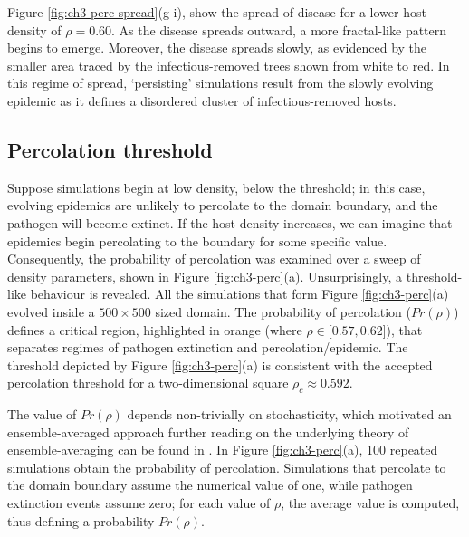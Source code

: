 Figure \ref{fig:ch3-perc-spread}(g-i), show the spread of disease for a lower host density of $\rho = 0.60$.
As the disease spreads outward, a more fractal-like pattern begins to emerge.
Moreover, the disease spreads slowly, as evidenced by the smaller area traced by the infectious-removed trees shown from white to red.
In this regime of spread, `persisting' simulations result from the slowly evolving epidemic as it defines a disordered cluster of infectious-removed hosts.
\newpage

\subsection{Percolation threshold}
\label{section:universality}

Suppose simulations begin at low density, below the threshold; in this case, evolving epidemics are unlikely to percolate to the domain boundary, and the pathogen will become extinct.
If the host density increases, we can imagine that epidemics begin percolating to the boundary for some specific value.
Consequently, the probability of percolation was examined over a sweep of density parameters, shown in Figure \ref{fig:ch3-perc}(a).
Unsurprisingly, a threshold-like behaviour is revealed.
All the simulations that form Figure \ref{fig:ch3-perc}(a) evolved inside a $500\times 500$ sized domain.
The probability of percolation ($Pr(\rho)$) defines
a critical region, highlighted in orange (where $ \rho \in [0.57, 0.62$]), that separates regimes of pathogen extinction and percolation/epidemic.
The threshold depicted by Figure \ref{fig:ch3-perc}(a) is consistent with the accepted percolation threshold for a two-dimensional square $\rho_c \approx 0.592$.

The value of $Pr(\rho)$ depends non-trivially on stochasticity, which motivated an ensemble-averaged approach\textemdash 
further reading on the underlying theory of ensemble-averaging can be found in \cite{gibbs1902elementary}.
In Figure \ref{fig:ch3-perc}(a), 100 repeated simulations obtain the probability of percolation. Simulations that percolate to the domain boundary assume the numerical value of one, while pathogen extinction events assume zero; for each value of $\rho$, the average value is computed, thus defining a probability $Pr(\rho)$.

